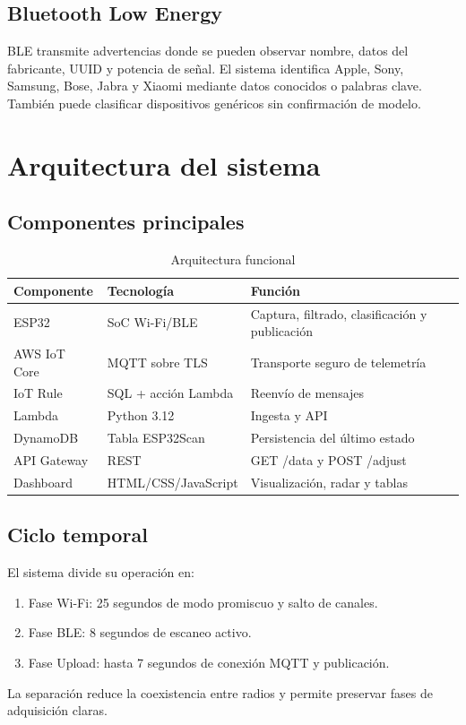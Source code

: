 \documentclass[12pt,a4paper]{article}
\begin{document}
\subsection{Bluetooth Low Energy}
BLE transmite advertencias donde se pueden observar nombre, datos del fabricante, UUID y potencia de señal. El sistema identifica Apple, Sony, Samsung, Bose, Jabra y Xiaomi mediante datos conocidos o palabras clave. También puede clasificar dispositivos genéricos sin confirmación de modelo.

\section{Arquitectura del sistema}
\subsection{Componentes principales}
\begin{table}[htbp]
\centering
\centering
\caption{Arquitectura funcional}
\begin{tabularx}{\textwidth}{@{}p{2.7cm}p{4.1cm}X@{}}
\toprule
Componente & Tecnología & Función \\
\midrule
ESP32 & SoC Wi-Fi/BLE & Captura, filtrado, clasificación y publicación \\
AWS IoT Core & MQTT sobre TLS & Transporte seguro de telemetría \\
IoT Rule & SQL + acción Lambda & Reenvío de mensajes \\
Lambda & Python 3.12 & Ingesta y API \\
DynamoDB & Tabla ESP32Scan & Persistencia del último estado \\
API Gateway & REST & GET /data y POST /adjust \\
Dashboard & HTML/CSS/JavaScript & Visualización, radar y tablas \\
\bottomrule
\end{tabularx}
\end{table}

\subsection{Ciclo temporal}
El sistema divide su operación en:
\begin{enumerate}
\item Fase Wi-Fi: 25 segundos de modo promiscuo y salto de canales.
\item Fase BLE: 8 segundos de escaneo activo.
\item Fase Upload: hasta 7 segundos de conexión MQTT y publicación.
\end{enumerate}
La separación reduce la coexistencia entre radios y permite preservar fases de adquisición claras.
\end{document}
